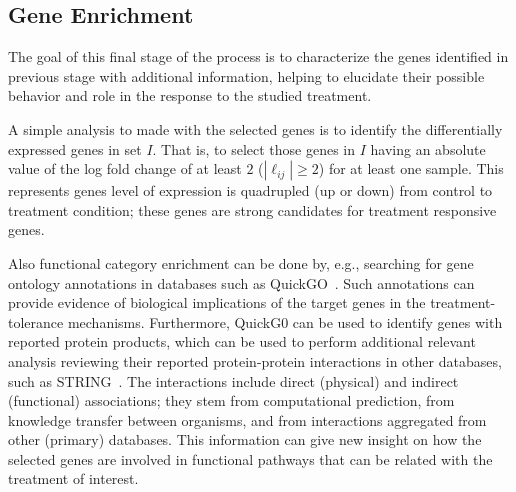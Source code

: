 \subsection{Gene Enrichment}

The goal of this final stage of the process is to characterize the
genes identified in previous stage with additional information, helping to elucidate their
possible behavior and role in the response to the studied treatment.

A simple analysis to made with the selected genes is to identify the
differentially expressed genes in set $I$. That is, to select those genes
in $I$ having an absolute value of the log fold change of at least $2$
($|\ell_{ij}|\geq 2$) for at least one sample. This
represents genes level of expression is quadrupled (up or down)
from control to treatment condition; these genes are
strong candidates for treatment responsive genes.

Also functional category enrichment can be done by, e.g., searching for gene ontology annotations in databases such as QuickGO~\cite{binns2009quickgo}. Such annotations 
can provide evidence of biological implications of the target genes in
the treatment-tolerance mechanisms. Furthermore, QuickG0 can be used to identify genes with reported protein products, which can be used to perform additional relevant
analysis reviewing their reported protein-protein interactions in other databases, such as STRING~\cite{szklarczyk2016string}. The interactions include direct (physical) and indirect (functional) associations; they stem from computational prediction, from knowledge
transfer between organisms, and from interactions aggregated from
other (primary) databases. This information can give new insight on how the
selected genes are involved in functional pathways that can be related
with the treatment of interest.
